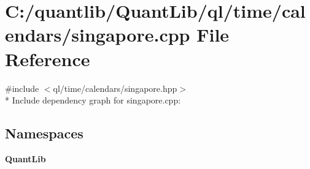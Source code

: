 \section{C\+:/quantlib/\+Quant\+Lib/ql/time/calendars/singapore.cpp File Reference}
\label{singapore_8cpp}
{\ttfamily \#include $<$ql/time/calendars/singapore.\+hpp$>$}\\*
Include dependency graph for singapore.\+cpp\+:
\subsection*{Namespaces}
\begin{DoxyCompactItemize}
\item 
 {\bf Quant\+Lib}
\end{DoxyCompactItemize}
